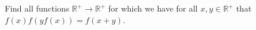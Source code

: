 Find all functions $\mathbb{R}^+\rightarrow\mathbb{R}^+$ for which we have for all $x,y\in \mathbb{R}^+$ that $f(x)f(yf(x))=f(x+y)$.